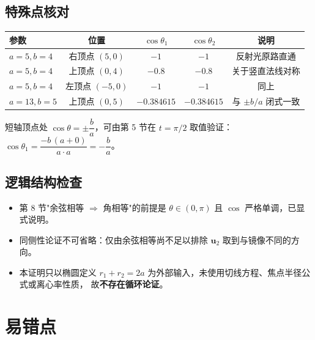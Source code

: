 \documentclass[11pt]{ctexart}
\newcommand{\uu}{\mathbf{u}}
\begin{document}
\subsection{特殊点核对}
\begin{center}
\begin{tabular}{@{}lcccc@{}}
\toprule
参数 & 位置 & $\cos\theta_{1}$ & $\cos\theta_{2}$ & 说明\\
\midrule
$a=5,b=4$ & 右顶点 $(5,0)$ & $-1$ & $-1$ & 反射光原路直通\\
$a=5,b=4$ & 上顶点 $(0,4)$ & $-0.8$ & $-0.8$ & 关于竖直法线对称\\
$a=5,b=4$ & 左顶点 $(-5,0)$ & $-1$ & $-1$ & 同上\\
$a=13,b=5$ & 上顶点 $(0,5)$ & $-0.384615$ & $-0.384615$ & 与 $\pm b/a$ 闭式一致\\
\bottomrule
\end{tabular}
\end{center}
短轴顶点处 $\cos\theta=\pm\dfrac{b}{a}$，可由第 5 节在 $t=\pi/2$ 取值验证：
$\cos\theta_{1}=\dfrac{-b\,(a+0)}{a\cdot a}=-\dfrac{b}{a}$。

\subsection{逻辑结构检查}
\begin{itemize}
\item 第 8 节"余弦相等 $\Rightarrow$ 角相等"的前提是 $\theta\in(0,\pi)$ 且 $\cos$ 严格单调，已显式说明。
\item 同侧性论证不可省略：仅由余弦相等尚不足以排除 $\uu_{2}$ 取到与镜像不同的方向。
\item 本证明只以椭圆定义 $r_{1}+r_{2}=2a$ 为外部输入，未使用切线方程、焦点半径公式或离心率性质，
故\textbf{不存在循环论证}。
\end{itemize}

\section{易错点}
\end{document}
